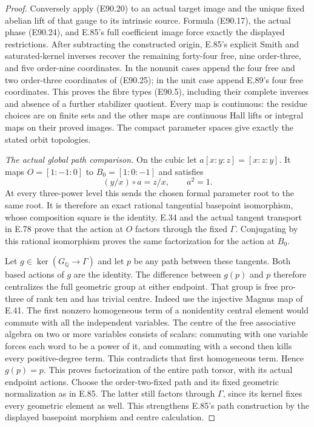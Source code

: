 \begin{proof}
Conversely apply (E90.20) to an actual target
image and the unique fixed abelian lift of
that gauge to its intrinsic source. Formula
(E90.17), the actual phase (E90.24), and
E.85's full coefficient image force exactly
the displayed restrictions. After subtracting
the constructed origin, E.85's explicit
Smith and saturated-kernel inverses recover
the remaining forty-four free, nine order-three,
and five order-nine coordinates. In the
nonunit cases append the four free and two
order-three coordinates of (E90.25); in the
unit case append E.89's four free coordinates.
This proves the fibre types (E90.5), including
their complete inverses and absence of a
further stabilizer quotient. Every map is
continuous: the residue choices are on finite
sets and the other maps are continuous Hall
lifts or integral maps on their proved images.
The compact parameter spaces give exactly
the stated orbit topologies.

\emph{The actual global path comparison.}
On the cubic let $a[x:y:z]=[x:z:y]$.
It maps $O=[1:-1:0]$ to $B_0=[1:0:-1]$ and
satisfies
\[
            (y/x)\circ a=z/x,
                 \qquad a^2=1.
 \tag{E90.27}
\]
At every three-power level this sends the
chosen formal parameter root to the same
root. It is therefore an exact rational
tangential basepoint isomorphism, whose
composition square is the identity.
E.34 and the actual tangent transport in
E.78 prove that the action at $O$ factors
through the fixed $\Gamma$. Conjugating by
this rational isomorphism proves the same
factorization for the action at $B_0$.

Let $g\in\ker(G_{\mathbb Q}\to\Gamma)$ and
let $p$ be any path between these tangents.
Both based actions of $g$ are the identity.
The difference between $g(p)$ and $p$
therefore centralizes the full geometric
group at either endpoint. That group is
free pro-three of rank ten and has trivial
centre. Indeed use the injective Magnus map
of E.41. The first nonzero homogeneous term
of a nonidentity central element would
commute with all the independent variables.
The centre of the free associative algebra
on two or more variables consists of scalars:
commuting with one variable forces each word
to be a power of it, and commuting with a
second then kills every positive-degree term.
This contradicts that first homogeneous term.
Hence $g(p)=p$. This proves factorization
of the entire path torsor, with its actual
endpoint actions. Choose the order-two-fixed
path and its fixed geometric normalization
as in E.85. The latter still factors through
$\Gamma$, since its kernel fixes every
geometric element as well. This strengthens
E.85's path construction by the displayed
basepoint morphism and centre calculation.


\end{proof}
